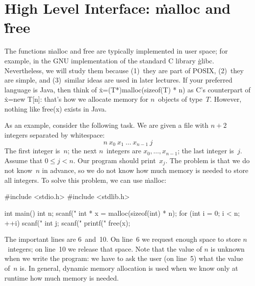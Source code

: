 



\newcommand\mem[1]{
  \foreach \x in {0,1,...,#1} {
    \draw (\x,0) rectangle (\x+1,1);
  }
}
\newcommand\memnum[1]{
  \foreach \x in {0,1,...,#1} {
    \draw[fill=gray] (\x,0) rectangle node{$\x$} (\x+1,1);
  }
}
\newcommand\memblock[3]{
  \draw[#1,very thick,rounded corners=1pt]
    (#2+0.2,0.2) rectangle (#3-0.2,0.8);
}
\newcommand\use[2]{\memblock{us}{#1}{#2}}
\newcommand\fre[2]{\memblock{fs}{#1}{#2}}
\newcommand\T{\tikz[baseline=2,scale=.4]}

\section*{High Level Interface: \.{malloc} and \.{free}}

The functions \.{malloc} and \.{free} are typically implemented in user space;
  for example, in the GNU implementation of the standard C library \.{glibc}.
Nevertheless, we will study them because
  (1)~they are part of POSIX,
  (2)~they are simple, and
  (3)~similar ideas are used in later lectures.
If your preferred language is Java,
  then think of \.{x=(T*)malloc(sizeof(T) * n)} as C's counterpart of \.{x=new T[n]}:
  that's how we allocate memory for $n$~objects of type~$T$.
However,
  nothing like \.{free(x)} exists in Java.

As an example, consider the following task.
We are given a file with $n+2$ integers separated by whitespace:
\[
  n\ x_0\ x_1\ \ldots\ x_{n-1}\ j
\]
The first integer is~$n$;
  the next $n$~integers are $x_0,\ldots,x_{n-1}$;
  the last integer is~$j$.
Assume that $0 \le j < n$.
Our program should print~$x_j$.
The problem is that we do not know~$n$ in advance,
  so we do not know how much memory is needed to store all integers.
To solve this problem, we can use \.{malloc}:
\begin{ccode}
#include <stdio.h>
#include <stdlib.h>

int main() {
  int n; scanf("%
  int * x = malloc(sizeof(int) * n);
  for (int i = 0; i < n; ++i) scanf("%
  int j; scanf("%
  printf("%
  free(x);
}
\end{ccode}
The important lines are 6~and~10.
On line~6 we request enough space to store $n$~integers;
  on line~10 we release that space.
Note that the value of $n$ is unknown when we write the program:
  we have to ask the user (on line~5) what the value of~$n$ is.
In general,
  dynamic memory allocation is used when we know only at runtime how much memory is needed.

